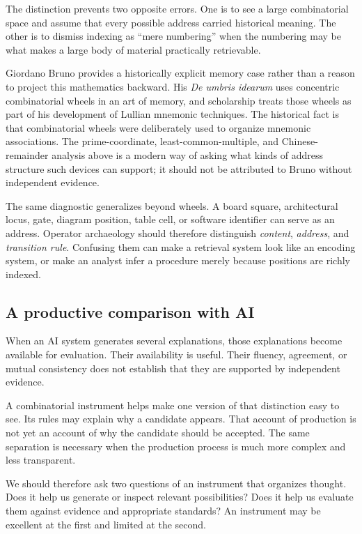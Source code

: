 \documentclass[11pt]{article}
\begin{document}
The distinction prevents two opposite errors. One is to see a large
combinatorial space and assume that every possible address carried historical
meaning. The other is to dismiss indexing as ``mere numbering'' when the
numbering may be what makes a large body of material practically retrievable.

Giordano Bruno provides a historically explicit memory case rather than a
reason to project this mathematics backward. His \emph{De umbris idearum}
uses concentric combinatorial wheels in an art of memory, and scholarship
treats those wheels as part of his development of Lullian mnemonic
techniques.\cite{brunoMemory} The historical fact is that combinatorial wheels
were deliberately used to organize mnemonic associations. The prime-coordinate,
least-common-multiple, and Chinese-remainder analysis above is a modern way of
asking what kinds of address structure such devices can support; it should not
be attributed to Bruno without independent evidence.

The same diagnostic generalizes beyond wheels. A board square, architectural
locus, gate, diagram position, table cell, or software identifier can serve as
an address. Operator archaeology should therefore distinguish \emph{content},
\emph{address}, and \emph{transition rule}. Confusing them can make a
retrieval system look like an encoding system, or make an analyst infer a
procedure merely because positions are richly indexed.
\subsection{A productive comparison with AI}

When an AI system generates several explanations, those explanations become
available for evaluation. Their availability is useful. Their fluency,
agreement, or mutual consistency does not establish that they are supported
by independent evidence.

A combinatorial instrument helps make one version of that distinction easy
to see. Its rules may explain why a candidate appears. That account of
production is not yet an account of why the candidate should be accepted.
The same separation is necessary when the production process is much more
complex and less transparent.

We should therefore ask two questions of an instrument that organizes thought.
Does it help us generate or inspect relevant possibilities? Does it help us
evaluate them against evidence and appropriate standards? An instrument may
be excellent at the first and limited at the second.
\end{document}
